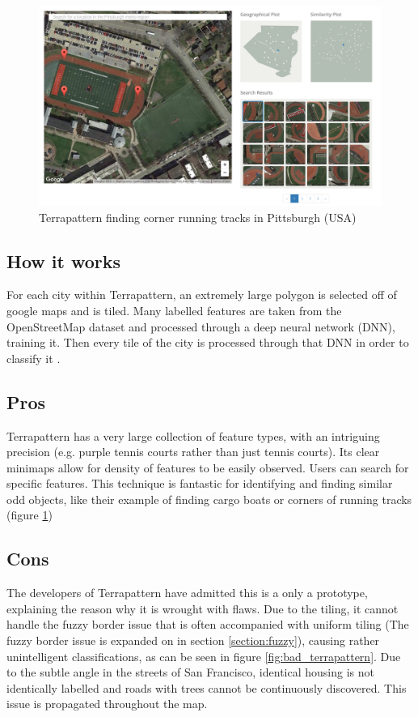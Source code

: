 \begin{figure}[H]
    \centering
    \includegraphics[width=\textwidth]{figs/2/terrapattern}
    \caption{Terrapattern finding corner running tracks in Pittsburgh (USA)}
    \label{fig:terrapattern}
\end{figure}

\subsection*{How it works}
For each city within Terrapattern, an extremely large polygon is selected off of google maps and is tiled. Many labelled features are taken from the OpenStreetMap dataset and processed through a deep neural network (DNN), training it. Then every tile of the city is processed through that DNN in order to classify it \citep{terrapattern:howitworks}.

\subsection*{Pros}
Terrapattern has a very large collection of feature types, with an intriguing precision (e.g. purple tennis courts rather than just tennis courts). Its clear minimaps allow for density of features to be easily observed. Users can search for specific features. This technique is fantastic for identifying and finding similar odd objects, like their example of finding cargo boats or corners of running tracks (figure \ref{fig:terrapattern})

\subsection*{Cons}
The developers of Terrapattern have admitted this is a only a prototype, explaining the reason why it is wrought with flaws. Due to the tiling, it cannot handle the fuzzy border issue that is often accompanied with uniform tiling (The fuzzy border issue is expanded on in section \ref{section:fuzzy}), causing rather unintelligent classifications, as can be seen in figure \ref{fig:bad_terrapattern}. Due to the subtle angle in the streets of San Francisco, identical housing is not identically labelled and roads with trees cannot be continuously discovered. This issue is propagated throughout the map. 


